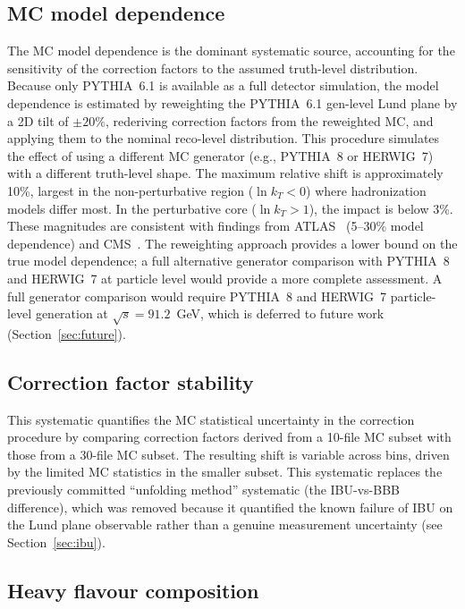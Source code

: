 \documentclass[11pt,a4paper]{article}
\begin{document}
\subsection{MC model dependence}
\label{sec:syst-model}

The MC model dependence is the dominant systematic source, accounting
for the sensitivity of the correction factors to the assumed
truth-level distribution.  Because only PYTHIA~6.1 is available as a
full detector simulation, the model dependence is estimated by
reweighting the PYTHIA~6.1 gen-level Lund plane by a 2D tilt of
$\pm 20\%$, rederiving correction factors from the reweighted MC, and
applying them to the nominal reco-level distribution.  This procedure
simulates the effect of using a different MC generator (e.g.,
PYTHIA~8 or HERWIG~7) with a different truth-level shape.  The maximum
relative shift is approximately 10\%, largest in the non-perturbative
region ($\ln k_T < 0$) where hadronization models differ most.  In the
perturbative core ($\ln k_T > 1$), the impact is below 3\%.  These
magnitudes are consistent with findings from ATLAS~\cite{ATLAS:2020bbn}
(5--30\% model dependence) and CMS~\cite{CMS:2024mlf}.  The
reweighting approach provides a lower bound on the true model
dependence; a full alternative generator comparison with PYTHIA~8 and
HERWIG~7 at particle level would provide a more complete
assessment.  A full generator comparison would require PYTHIA~8 and HERWIG~7
  particle-level generation at $\sqrt{s} = 91.2$~GeV, which is
  deferred to future work (Section~\ref{sec:future}).

\subsection{Correction factor stability}
\label{sec:syst-corr-stability}

This systematic quantifies the MC statistical uncertainty in the
correction procedure by comparing correction factors derived from a
10-file MC subset with those from a 30-file MC subset.  The resulting
shift is variable across bins, driven by the limited MC statistics in
the smaller subset.  This systematic replaces the previously committed
``unfolding method'' systematic (the IBU-vs-BBB difference), which was
removed because it quantified the known failure of IBU on the Lund plane
observable rather than a genuine measurement uncertainty (see
Section~\ref{sec:ibu}).

\subsection{Heavy flavour composition}
\label{sec:syst-heavy-flavour}
\end{document}
